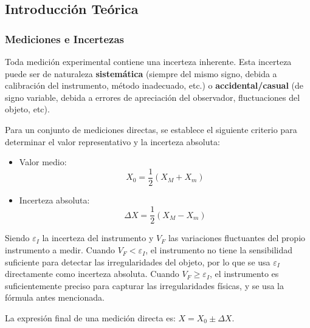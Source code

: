 \subsection{Introducción Teórica}
\label{subsec:introduccion-teorica}


\subsubsection{Mediciones e Incertezas}

Toda medición experimental contiene una incerteza inherente.
Esta incerteza puede ser de naturaleza \textbf{sistemática} (siempre del mismo signo, debida a calibración del instrumento, método inadecuado, etc.) o \textbf{accidental/casual} (de signo variable, debida a errores de apreciación del observador, fluctuaciones del objeto, etc).

Para un conjunto de mediciones directas, se establece el siguiente criterio \cite{catedra2007mediciones} para determinar el valor representativo y la incerteza absoluta:
\begin{itemize}
    \item Valor medio:
    \begin{equation}
        X_0 = \frac{1}{2}(X_{M} + X_{m})
        \label{eq:valor-medio}
    \end{equation}
    \item Incerteza absoluta:
    \begin{equation}
        \Delta X = \frac{1}{2}(X_{M} - X_{m})
        \label{eq:incerteza-absoluta}
    \end{equation}
\end{itemize}

Siendo $\varepsilon_I$ la incerteza del instrumento y $V_F$ las variaciones fluctuantes del propio instrumento a medir.
Cuando $V_F < \varepsilon_I$, el instrumento no tiene la sensibilidad suficiente para detectar las irregularidades del objeto, por lo que se usa $\varepsilon_I$ directamente como incerteza absoluta.
Cuando $V_F \geq \varepsilon_I$, el instrumento es suficientemente preciso para capturar las irregularidades físicas, y se usa la fórmula antes mencionada.

La expresión final de una medición directa es: $X = X_0 \pm \Delta X$.

